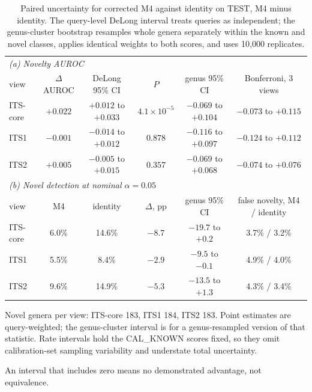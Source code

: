 \begin{table}[htbp]\centering
\begin{threeparttable}
\caption{Paired uncertainty for corrected M4 against identity on TEST, M4 minus identity. The query-level DeLong interval treats queries as independent; the genus-cluster bootstrap resamples whole genera separately within the known and novel classes, applies identical weights to both scores, and uses 10,000 replicates.}
\label{tab:uncertainty}
\footnotesize
\setlength{\tabcolsep}{4pt}
\begin{tabular}{lccccc}
\toprule
\multicolumn{6}{l}{\emph{(a) Novelty AUROC}} \\
view & $\Delta$AUROC & DeLong 95\% CI & $P$ & genus 95\% CI & Bonferroni, 3 views \\
\midrule
ITS-core & $+0.022$ & $+0.012$ to $+0.033$ & $4.1\times10^{-5}$ & $-0.069$ to $+0.104$ & $-0.073$ to $+0.115$ \\
ITS1 & $-0.001$ & $-0.014$ to $+0.012$ & $0.878$ & $-0.116$ to $+0.097$ & $-0.124$ to $+0.112$ \\
ITS2 & $+0.005$ & $-0.005$ to $+0.015$ & $0.357$ & $-0.069$ to $+0.068$ & $-0.074$ to $+0.076$ \\
\midrule
\multicolumn{6}{l}{\emph{(b) Novel detection at nominal $\alpha=0.05$}} \\
view & M4 & identity & $\Delta$, pp & genus 95\% CI & false novelty, M4 / identity \\
\midrule
ITS-core & 6.0\% & 14.6\% & $-8.7$ & $-19.7$ to $+0.2$ & 3.7\% / 3.2\% \\
ITS1 & 5.5\% & 8.4\% & $-2.9$ & $-9.5$ to $-0.1$ & 4.9\% / 4.0\% \\
ITS2 & 9.6\% & 14.9\% & $-5.3$ & $-13.5$ to $+1.3$ & 4.3\% / 3.4\% \\
\bottomrule
\end{tabular}
\begin{tablenotes}\footnotesize
\item Novel genera per view: ITS-core 183, ITS1 184, ITS2 183. Point estimates are query-weighted; the genus-cluster interval is for a genus-resampled version of that statistic. Rate intervals hold the CAL\_KNOWN scores fixed, so they omit calibration-set sampling variability and understate total uncertainty.
\item An interval that includes zero means no demonstrated advantage, not equivalence.
\end{tablenotes}
\end{threeparttable}
\end{table}
